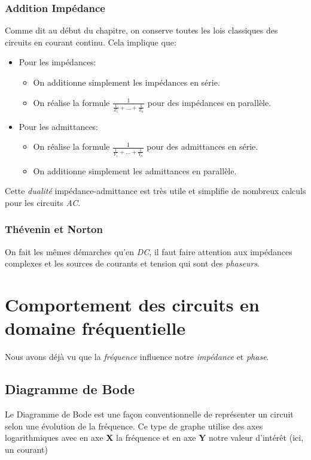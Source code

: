 \documentclass{report}
\begin{document}
\subsection{Addition Impédance}
Comme dit au début du chapitre, on conserve toutes les lois classiques des circuits en courant continu. Cela implique que:
\begin{itemize}
\item Pour les impédances:
	\begin{itemize}
	\item On additionne simplement les impédances en série.
	\item On réalise la formule $\frac{1}{\frac{1}{Z_1} + ... + \frac{1}{Z_n}}$ pour des impédances en parallèle.
	\end{itemize}
\item Pour les admittances:
	\begin{itemize}
	\item On réalise la formule $\frac{1}{\frac{1}{Y_1} + ... + \frac{1}{Y_n}}$ pour des admittances en série.
	\item On additionne simplement les admittances en parallèle.
	\end{itemize}
\end{itemize}
Cette \textit{dualité} impédance-admittance est très utile et simplifie de nombreux calculs pour les circuits \textit{AC}.

\subsection{Thévenin et Norton}
On fait les mêmes démarches qu'en \textit{DC}, il faut faire attention aux impédances complexes et les sources de courants et tension qui sont des \textit{phaseurs}.

\chapter{Comportement des circuits en domaine fréquentielle}
Nous avons déjà vu que la \textit{fréquence} influence notre \textit{impédance} et \textit{phase}.

\section{Diagramme de Bode}
Le Diagramme de Bode est une façon conventionnelle de représenter un circuit selon une évolution de la fréquence. Ce type de graphe utilise des axes logarithmiques avec en axe \textbf{X} la fréquence et en axe \textbf{Y} notre valeur d'intérêt (ici, un courant)
\end{document}
